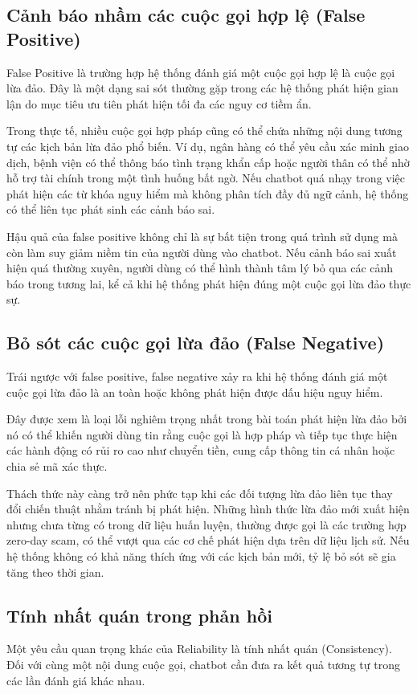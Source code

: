 \subsection{Cảnh báo nhầm các cuộc gọi hợp lệ (False Positive)}
False Positive là trường hợp hệ thống đánh giá một cuộc gọi hợp lệ là cuộc gọi lừa đảo. Đây là một dạng sai sót thường gặp trong các hệ thống phát hiện gian lận do mục tiêu ưu tiên phát hiện tối đa các nguy cơ tiềm ẩn.

Trong thực tế, nhiều cuộc gọi hợp pháp cũng có thể chứa những nội dung tương tự các kịch bản lừa đảo phổ biến. Ví dụ, ngân hàng có thể yêu cầu xác minh giao dịch, bệnh viện có thể thông báo tình trạng khẩn cấp hoặc người thân có thể nhờ hỗ trợ tài chính trong một tình huống bất ngờ. Nếu chatbot quá nhạy trong việc phát hiện các từ khóa nguy hiểm mà không phân tích đầy đủ ngữ cảnh, hệ thống có thể liên tục phát sinh các cảnh báo sai.

Hậu quả của false positive không chỉ là sự bất tiện trong quá trình sử dụng mà còn làm suy giảm niềm tin của người dùng vào chatbot. Nếu cảnh báo sai xuất hiện quá thường xuyên, người dùng có thể hình thành tâm lý bỏ qua các cảnh báo trong tương lai, kể cả khi hệ thống phát hiện đúng một cuộc gọi lừa đảo thực sự.

\subsection{Bỏ sót các cuộc gọi lừa đảo (False Negative)}
Trái ngược với false positive, false negative xảy ra khi hệ thống đánh giá một cuộc gọi lừa đảo là an toàn hoặc không phát hiện được dấu hiệu nguy hiểm.

Đây được xem là loại lỗi nghiêm trọng nhất trong bài toán phát hiện lừa đảo bởi nó có thể khiến người dùng tin rằng cuộc gọi là hợp pháp và tiếp tục thực hiện các hành động có rủi ro cao như chuyển tiền, cung cấp thông tin cá nhân hoặc chia sẻ mã xác thực.

Thách thức này càng trở nên phức tạp khi các đối tượng lừa đảo liên tục thay đổi chiến thuật nhằm tránh bị phát hiện. Những hình thức lừa đảo mới xuất hiện nhưng chưa từng có trong dữ liệu huấn luyện, thường được gọi là các trường hợp zero-day scam, có thể vượt qua các cơ chế phát hiện dựa trên dữ liệu lịch sử. Nếu hệ thống không có khả năng thích ứng với các kịch bản mới, tỷ lệ bỏ sót sẽ gia tăng theo thời gian.

\subsection{Tính nhất quán trong phản hồi}
Một yêu cầu quan trọng khác của Reliability là tính nhất quán (Consistency). Đối với cùng một nội dung cuộc gọi, chatbot cần đưa ra kết quả tương tự trong các lần đánh giá khác nhau.

